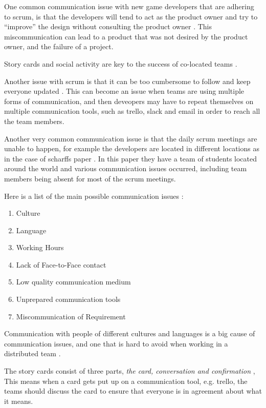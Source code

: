 \documentclass{scrartcl}
\begin{document}
One common communication issue with new game developers that are adhering to scrum, is that the developers will tend to act as the product owner and try to ``improve'' the design without consulting the product owner \cite{krasteva2008}. This miscommunication can lead to a product that was not desired by the product owner, and the failure of a project. \par

 Story cards and social activity are key to the success of co-located teams \cite{abdullah2011}. \par

Another issue with scrum is that it can be too cumbersome to follow and keep everyone updated \cite{scharff2012}. This can become an issue when teams are using multiple forms of communication, and then deveopers may have to repeat themselves on multiple communication tools, such as trello, slack and email in order to reach all the team members. \par

Another very common communication issue is that the daily scrum meetings are unable to happen, for example the developers are located in different locations as in the case of scharffs paper \cite{scharff2012}. In this paper they have a team of students located around the world and various communication issues occurred, including team members being absent for most of the scrum meetings. 

Here is a list of the main possible communication issues \cite{joshi2013}: 

\begin{enumerate}
\item Culture
\item Language
\item Working Hours
\item Lack of Face-to-Face contact
\item Low quality communication medium
\item Unprepared communication tools
\item Miscommunication of Requirement
\end{enumerate}

Communication with people of different cultures and languages is a big cause of communication issues, and one that is hard to avoid when working in a distributed team \cite{cohn2003}.

The story cards consist of three parts, \textit{the card, conversation and confirmation} \cite{abdullah2011}, This means when a card gets put up on a communication tool, e.g. trello, the teams should discuss the card to ensure that everyone is in agreement about what it means. 
\end{document}
